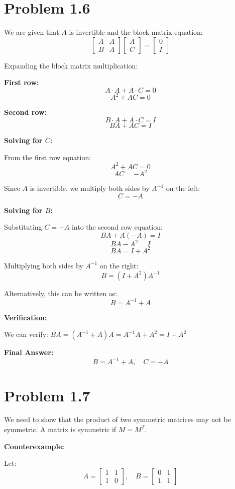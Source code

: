 \section*{Problem 1.6}

We are given that $A$ is invertible and the block matrix equation:
\[
\begin{bmatrix} A & A \\ B & A \end{bmatrix} \begin{bmatrix} A \\ C \end{bmatrix} = \begin{bmatrix} 0 \\ I \end{bmatrix}
\]

Expanding the block matrix multiplication:

\textbf{First row:}
\[
A \cdot A + A \cdot C = 0
\]
\[
A^2 + AC = 0
\]

\textbf{Second row:}
\[
B \cdot A + A \cdot C = I
\]
\[
BA + AC = I
\]

\textbf{Solving for $C$:}

From the first row equation:
\[
A^2 + AC = 0
\]
\[
AC = -A^2
\]

Since $A$ is invertible, we multiply both sides by $A^{-1}$ on the left:
\[
C = -A
\]

\textbf{Solving for $B$:}

Substituting $C = -A$ into the second row equation:
\[
BA + A(-A) = I
\]
\[
BA - A^2 = I
\]
\[
BA = I + A^2
\]

Multiplying both sides by $A^{-1}$ on the right:
\[
B = (I + A^2)A^{-1}
\]

Alternatively, this can be written as:
\[
B = A^{-1} + A
\]

\textbf{Verification:}

We can verify: $BA = (A^{-1} + A)A = A^{-1}A + A^2 = I + A^2$ \checkmark

\textbf{Final Answer:}
\[
\boxed{B = A^{-1} + A, \quad C = -A}
\]


\section*{Problem 1.7}

We need to show that the product of two symmetric matrices may not be symmetric. A matrix is symmetric if $M = M^T$.

\textbf{Counterexample:}

Let:
\[
A = \begin{bmatrix} 1 & 1 \\ 1 & 0 \end{bmatrix}, \quad B = \begin{bmatrix} 0 & 1 \\ 1 & 1 \end{bmatrix}
\]

